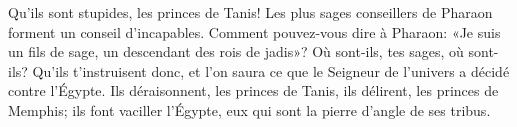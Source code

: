 Qu’ils sont stupides, les princes de Tanis!
	Les plus sages conseillers de Pharaon forment un conseil d’incapables.
Comment pouvez-vous dire à Pharaon:
	«Je suis un fils de sage, un descendant des rois de jadis»?
Où sont-ils, tes sages, où sont-ils?
	Qu’ils t’instruisent donc,
	et l’on saura ce que le Seigneur de l’univers a décidé contre l’Égypte.
Ils déraisonnent, les princes de Tanis,
	ils délirent, les princes de Memphis;
	ils font vaciller l’Égypte, eux qui sont la pierre d’angle de ses tribus.
